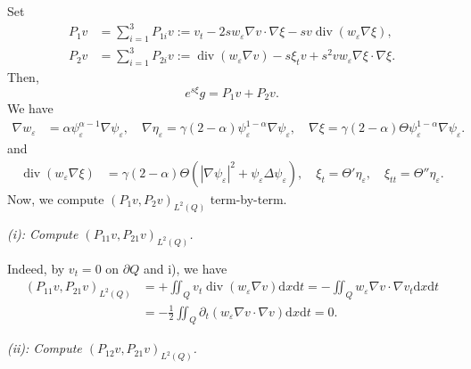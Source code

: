 \documentclass[11pt]{article}
\numberwithin{equation}{section}
\def\df{\mathrm d}
\DeclareMathOperator{\Div}{div}
\begin{document}
Set
\begin{equation*}
\begin{split}
P_1v
&= \sum_{i=1}^3 P_{1i}v := v_t - 2sw_\varepsilon\nabla v \cdot \nabla \xi - sv\Div(w_\varepsilon \nabla\xi),\\
P_2v
&= \sum_{i=1}^3 P_{2i}v := \Div(w_\varepsilon\nabla v) - s\xi_t v + s^2vw_\varepsilon \nabla\xi \cdot \nabla\xi.
\end{split}
\end{equation*}
Then,
\begin{equation*}
e^{s\xi}g = P_1v + P_2v.
\end{equation*}
We have
\begin{equation*}
\begin{split}
\nabla w_\varepsilon &= \alpha\psi_\varepsilon^{\alpha-1}\nabla\psi_\varepsilon,  \quad \nabla \eta_\varepsilon = \gamma(2-\alpha)\psi_\varepsilon^{1-\alpha}\nabla\psi_\varepsilon,  \quad \nabla \xi = \gamma (2-\alpha)\Theta \psi_\varepsilon^{1-\alpha}\nabla\psi_\varepsilon.
\end{split}
\end{equation*}
and
\begin{equation}\label{12.21.2}
\begin{split}
\Div(w_\varepsilon\nabla\xi) &= \gamma(2-\alpha)\Theta (|\nabla\psi_\varepsilon|^2 + \psi_\varepsilon \Delta\psi_\varepsilon),   \quad \xi_t = \Theta'\eta_\varepsilon,   \quad \xi_{tt} = \Theta''\eta_\varepsilon.
\end{split}
\end{equation}
Now, we compute $(P_1v, P_2v)_{L^2(Q)}$ term-by-term.

{\it (i):  Compute $(P_{11}v, P_{21}v)_{L^2(Q)}$.}

Indeed, by $v_t = 0$ on $\partial Q$ and i), we have
\begin{equation*}
\begin{split}
(P_{11}v, P_{21}v)_{L^2(Q)}
&= +\iint_Q v_t\Div(w_\varepsilon\nabla v)\df x\df t = -\iint_Q w_\varepsilon \nabla v \cdot \nabla v_t\df x\df t\\
&= -\frac{1}{2}\iint_Q\partial_t (w_\varepsilon\nabla v \cdot\nabla v)\df x\df t = 0.
\end{split}
\end{equation*}

{\it (ii): Compute $(P_{12}v, P_{21}v)_{L^2(Q)}$.}
\end{document}
